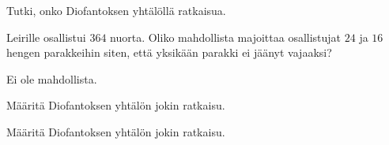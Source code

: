 \begin{tehtavasivu}

\begin{tehtava}
    Tutki, onko Diofantoksen yhtälöllä ratkaisua.
    
    \begin{alakohdat}
    \end{alakohdat}

    \begin{vastaus}
        \begin{alakohdat}
        \end{alakohdat}
    \end{vastaus}
    
\end{tehtava}

\begin{tehtava}
    Leirille osallistui $364$ nuorta. Oliko mahdollista majoittaa osallistujat $24$ ja $16$ hengen parakkeihin siten, että yksikään parakki ei jäänyt vajaaksi?
    
    \begin{vastaus}
        Ei ole mahdollista.
    \end{vastaus}
    
\end{tehtava}

\begin{tehtava}
    Määritä Diofantoksen yhtälön jokin ratkaisu.
    
    \begin{alakohdat}
    \end{alakohdat}

    \begin{vastaus}
        \begin{alakohdat}
        \end{alakohdat}
    \end{vastaus}
    
\end{tehtava}

\begin{tehtava}
    Määritä Diofantoksen yhtälön jokin ratkaisu.
    

\end{tehtava}
\end{tehtavasivu}
